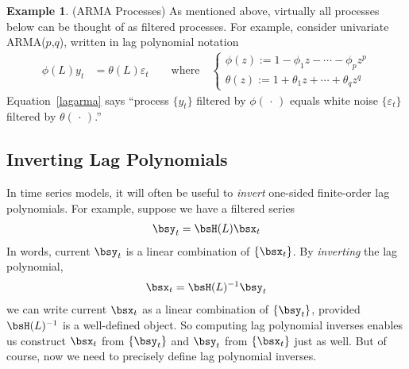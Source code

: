 \documentclass[12pt]{article}
\theoremstyle{plain}
\theoremstyle{definition}
\newtheorem{ex}[thm]{Example}
\theoremstyle{remark}
\begin{document}
\begin{ex}(ARMA Processes)
\label{ex:armafiltered}
As mentioned above, virtually all processes below can be thought of as
filtered processes.
For example, consider univariate ARMA($p$,$q$), written in lag
polynomial notation
\begin{align}
  \phi(L)y_t
  &=
  \theta(L)\varepsilon_t
  \qquad
  \text{where}\quad
  \begin{cases}
  \phi(z) := 1 - \phi_1 z - \cdots - \phi_pz^p \\
  \theta(z) := 1+ \theta_1 z + \cdots +\theta_qz^q
  \end{cases}
  \label{lagarma}
\end{align}
Equation~\ref{lagarma} says ``process $\{y_t\}$ filtered by
$\phi(\,\cdot\,)$ equals white noise $\{\varepsilon_t\}$ filtered by
$\theta(\,\cdot\,)$.''
\end{ex}


\clearpage
\subsection{Inverting Lag Polynomials}

In time series models, it will often be useful to \emph{invert}
one-sided finite-order lag polynomials. For example, suppose we have a
filtered series
\begin{align}
  \bsy_t = \bsH(L) \bsx_t
  \label{laginvy}
\end{align}
In words, current $\bsy_t$ is a linear combination of $\{\bsx_t\}$. By
\emph{inverting} the lag polynomial,
\begin{align}
  \bsx_t = \bsH(L)^{-1} \bsy_t
  \label{laginvx}
\end{align}
we can write current $\bsx_t$ as a linear combination of $\{\bsy_t\}$,
provided $\bsH(L)^{-1}$ is a well-defined object.
So computing lag polynomial inverses enables us construct
$\bsx_t$ from $\{\bsy_t\}$ and $\bsy_t$ from $\{\bsx_t\}$ just as well.
But of course, now we need to precisely define lag polynomial inverses.
\end{document}
